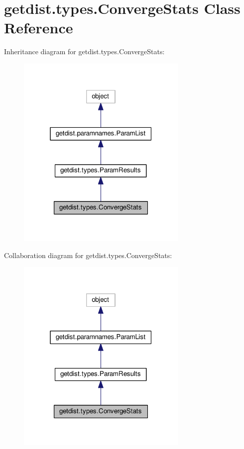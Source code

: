 \hypertarget{classgetdist_1_1types_1_1ConvergeStats}{}\section{getdist.\+types.\+Converge\+Stats Class Reference}
\label{classgetdist_1_1types_1_1ConvergeStats}


Inheritance diagram for getdist.\+types.\+Converge\+Stats\+:
\nopagebreak
\begin{figure}[H]
\begin{center}
\leavevmode
\includegraphics[width=232pt]{classgetdist_1_1types_1_1ConvergeStats__inherit__graph}
\end{center}
\end{figure}


Collaboration diagram for getdist.\+types.\+Converge\+Stats\+:
\nopagebreak
\begin{figure}[H]
\begin{center}
\leavevmode
\includegraphics[width=232pt]{classgetdist_1_1types_1_1ConvergeStats__coll__graph}
\end{center}
\end{figure}
